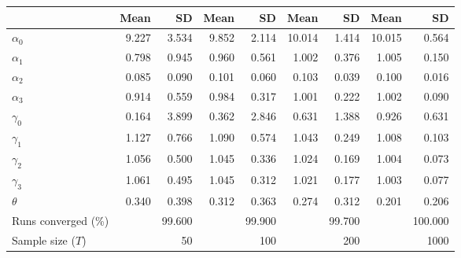 
\begin{tabular}[t]{lrrrrrrrr}
\toprule
  & Mean & SD & Mean  & SD  & Mean   & SD   & Mean    & SD   \\
\midrule
$\alpha_{0}$ & 9.227 & 3.534 & 9.852 & 2.114 & 10.014 & 1.414 & 10.015 & 0.564\\
$\alpha_{1}$ & 0.798 & 0.945 & 0.960 & 0.561 & 1.002 & 0.376 & 1.005 & 0.150\\
$\alpha_{2}$ & 0.085 & 0.090 & 0.101 & 0.060 & 0.103 & 0.039 & 0.100 & 0.016\\
$\alpha_{3}$ & 0.914 & 0.559 & 0.984 & 0.317 & 1.001 & 0.222 & 1.002 & 0.090\\
$\gamma_{0}$ & 0.164 & 3.899 & 0.362 & 2.846 & 0.631 & 1.388 & 0.926 & 0.631\\
$\gamma_{1}$ & 1.127 & 0.766 & 1.090 & 0.574 & 1.043 & 0.249 & 1.008 & 0.103\\
$\gamma_{2}$ & 1.056 & 0.500 & 1.045 & 0.336 & 1.024 & 0.169 & 1.004 & 0.073\\
$\gamma_{3}$ & 1.061 & 0.495 & 1.045 & 0.312 & 1.021 & 0.177 & 1.003 & 0.077\\
$\theta$ & 0.340 & 0.398 & 0.312 & 0.363 & 0.274 & 0.312 & 0.201 & 0.206\\
Runs converged (\%) &  & 99.600 &  & 99.900 &  & 99.700 &  & 100.000\\
Sample size ($T$) &  & 50 &  & 100 &  & 200 &  & 1000\\
\bottomrule
\end{tabular}
